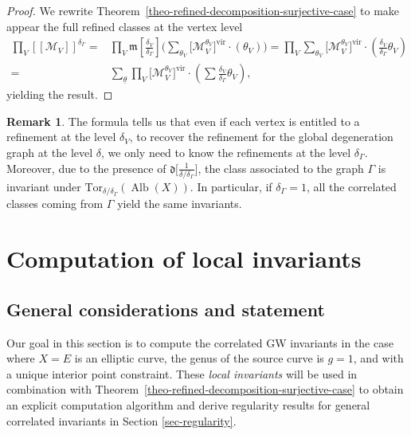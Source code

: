 \documentclass[pdftex]{sigma}
\newcommand{\Tor}{\mathrm{Tor}}
\newcommand{\vir}[1]{\big[#1\big]^\mathrm{vir}}
\newcommand{\fvir}[2]{[\![ #1 ]\!]^{#2}}
\newcommand{\m}[1]{\mfk\left[ #1 \right]}
\newcommand{\Alb}{\operatorname{Alb}}
\newcommand{\btheta}{ {\underline{\theta}} }
\newcommand{\mfk}{\mathfrak{m}}
\newcommand{\dfk}{\mathfrak{d}}
\newcommand{\M}{\mathcal{M}}
\numberwithin{equation}{section}
\theoremstyle{definition}
\newtheorem{remarkk}[theo]{Remark}
\begin{document}
\begin{proof}
We rewrite Theorem~\ref{theo-refined-decomposition-surjective-case} to make appear the full refined classes at the vertex level
	\begin{align*}
	\prod_V\fvir{\M_V}{\delta_\Gamma} = & \prod_V \m{\frac{\delta_V}{\delta_\Gamma}}\biggl(\sum_{\theta_V} \vir{\M_V^{\theta_V}}\cdot (\theta_V) \biggr)
	= \prod_V\sum_{\theta_V} \vir{\M_V^{\theta_V}}\cdot \left(\frac{\delta_V}{\delta_\Gamma}\theta_V\right) \\
	= & \sum_{\btheta} \prod_V\vir{\M_V^{\theta_V}}\cdot \left(\sum\frac{\delta_V}{\delta_\Gamma}\theta_V \right),
	\end{align*}
	yielding the result.
\end{proof}

\begin{remarkk}
The formula tells us that even if each vertex is entitled to a refinement at the level $\delta_V$, to recover the refinement for the global degeneration graph at the level $\delta$, we only need to know the refinements at the level $\delta_\Gamma$. Moreover, due to the presence of $\dfk\big[\frac{1}{\delta/\delta_\Gamma}\big]$, the class associated to the graph $\Gamma$ is invariant under $\Tor_{\delta/\delta_\Gamma}(\Alb(X))$. In particular, if $\delta_\Gamma=1$, all the correlated classes coming from $\Gamma$ yield the same invariants.
\end{remarkk}



	




\section{Computation of local invariants}
\label{sec-computation-local-invariants}

\subsection{General considerations and statement}

Our goal in this section is to compute the correlated GW invariants in the case where $X=E$ is an elliptic curve, the genus of the source curve is $g=1$, and with a unique interior point constraint. These \textit{local invariants} will be used in combination with Theorem~\ref{theo-refined-decomposition-surjective-case} to obtain an explicit computation algorithm and derive regularity results for general correlated invariants in Section \ref{sec-regularity}.
\end{document}
